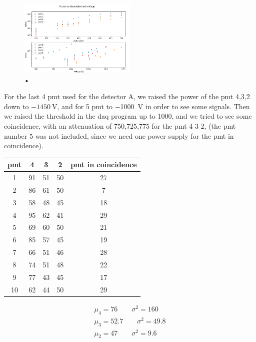 \documentclass[10pt,a4paper]{article}
\begin{document}
\begin{figure}[hbtp]
\centering
\includegraphics[width= 0.5\textwidth]{figures/AttenuationA6789.png}
\caption{•}
\end{figure}


For the last 4 pmt used for the detector A, we raised the power of the pmt 4,3,2 down to $\SI{-1450}{\volt}$, and for 5 pmt to \SI{-1000}{\volt} in order to see some signals. Then we raised the threshold in the daq program up to 1000, and we tried to see some coincidence, with an attenuation of 750,725,775 for the pmt 4 3 2, (the pmt number 5 was not included, since we need one power supply for the pmt in coincidence). 
\begin{center}
\begin{tabular}{|c|c|c|c|c|}
\hline 
pmt & 4 & 3 & 2 & pmt in coincidence \\ 
\hline 
1 & 91 & 51 & 50 & 27 \\ 
\hline 
2 & 86 & 61 & 50 & 7 \\ 
\hline 
3 & 58 & 48 & 45 & 18 \\ 
\hline 
4 & 95 & 62 & 41 & 29 \\ 
\hline 
5 & 69 & 60 & 50 & 21 \\ 
\hline 
6 & 85 & 57 & 45 & 19 \\ 
\hline 
7 & 66 & 51 & 46 & 28 \\ 
\hline 
8 & 74 & 51 & 48 & 22 \\ 
\hline 
9 & 77 & 43 & 45 & 17 \\ 
\hline 
10 & 62 & 44 & 50 & 29 \\ 
\hline 
\end{tabular} 
\end{center}

\begin{equation*}
\begin{split}
\mu_{4} = 76 \qquad \sigma^{2} =160  \\
\mu_{3} = 52.7 \qquad \sigma^{2} = 49.8 \\
\mu_{2} = 47  \qquad \sigma^{2} = 9.6
\end{split}
\end{equation*}
\end{document}
